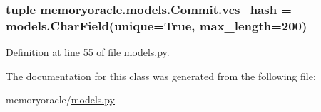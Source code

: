 \subsubsection[{vcs\+\_\+hash}]{\setlength{\rightskip}{0pt plus 5cm}tuple memoryoracle.\+models.\+Commit.\+vcs\+\_\+hash = models.\+Char\+Field(unique=True, max\+\_\+length=200)\hspace{0.3cm}{\ttfamily [static]}}\label{classmemoryoracle_1_1models_1_1Commit_a6c92b2816250c6dfc2ae6f67e94fa472}


Definition at line 55 of file models.\+py.



The documentation for this class was generated from the following file\+:\begin{DoxyCompactItemize}
\item 
memoryoracle/\hyperlink{models_8py}{models.\+py}\end{DoxyCompactItemize}
